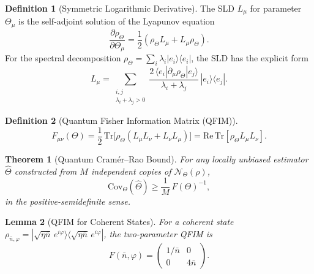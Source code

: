 \documentclass[journal,twocolumn]{IEEEtran}
\theoremstyle{definition}
\newtheorem{definition}{Definition}[section]
\theoremstyle{plain}
\newtheorem{theorem}{Theorem}[section]
\newtheorem{lemma}[theorem]{Lemma}
\newcommand{\Tr}{\mathrm{Tr}}
\begin{document}
\begin{definition}[Symmetric Logarithmic Derivative]
The SLD $L_\mu$ for parameter $\Theta_\mu$ is the self-adjoint
solution of the Lyapunov equation
\begin{equation}
  \frac{\partial \rho_\Theta}{\partial \Theta_\mu}
  = \frac{1}{2}(\rho_\Theta L_\mu + L_\mu \rho_\Theta).
  \label{eq:sld_def}
\end{equation}
For the spectral decomposition $\rho_\Theta =
\sum_i \lambda_i |e_i\rangle\langle e_i|$, the SLD has the explicit form
\begin{equation}
  L_\mu = \sum_{\substack{i,j \\ \lambda_i + \lambda_j > 0}}
  \frac{2\,\langle e_i|\partial_\mu\rho_\Theta|e_j\rangle}
       {\lambda_i + \lambda_j}\,|e_i\rangle\langle e_j|.
  \label{eq:SLD}
\end{equation}
\end{definition}

\begin{definition}[Quantum Fisher Information Matrix (QFIM)]
\begin{equation}
  F_{\mu\nu}(\Theta) = \frac{1}{2}\,\Tr\bigl[\rho_\Theta
    (L_\mu L_\nu + L_\nu L_\mu)\bigr]
  = \mathrm{Re}\,\Tr[\rho_\Theta L_\mu L_\nu].
  \label{eq:QFIM}
\end{equation}
\end{definition}

\begin{theorem}[Quantum Cram\'{e}r--Rao Bound]
\label{thm:QCRB}
For any locally unbiased estimator $\hat\Theta$ constructed from
$M$ independent copies of $\mathcal{N}_\Theta(\rho)$,
\begin{equation}
  \mathrm{Cov}_\Theta(\hat\Theta) \ge \frac{1}{M}\,F(\Theta)^{-1},
  \label{eq:QCRB}
\end{equation}
in the positive-semidefinite sense.
\end{theorem}

\begin{lemma}[QFIM for Coherent States]
\label{lem:qfim_coherent}
For a coherent state $\rho_{\bar n, \varphi} =
|\sqrt{\eta\bar n}\,e^{i\varphi}\rangle
\langle\sqrt{\eta\bar n}\,e^{i\varphi}|$, the two-parameter QFIM is
\begin{equation}
  F(\bar n, \varphi) =
  \begin{pmatrix} 1/\bar n & 0 \\ 0 & 4\bar n \end{pmatrix}.
  \label{eq:qfim_coherent}
\end{equation}
\end{lemma}
\end{document}
